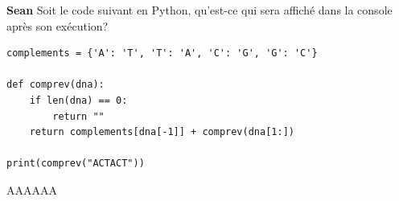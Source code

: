 \begin{Exercice}[5 minutes]\textbf{Sean}
Soit le code suivant en Python, qu'est-ce qui sera affiché dans la console après son exécution?

\begin{lstlisting}[style=pythonstyle]
complements = {'A': 'T', 'T': 'A', 'C': 'G', 'G': 'C'}

def comprev(dna):
    if len(dna) == 0:
        return ""
    return complements[dna[-1]] + comprev(dna[1:])

print(comprev("ACTACT"))
\end{lstlisting}


\begin{solution}
AAAAAA
\end{solution}
\end{Exercice}

